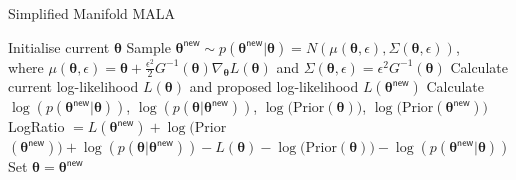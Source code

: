 \documentclass[11pt]{amsart}
\begin{document}
\begin{algorithm}[h]                      %
\caption{Simplified Manifold MALA}          %
\label{alg:SmMALARecipe}                           %
\begin{algorithmic}[1]                   %
\STATE Initialise current $\boldsymbol\theta$
\STATE Sample $\boldsymbol\theta^{\textsf{new}} \sim p(\boldsymbol\theta^{\textsf{new}}|\boldsymbol\theta) = N(\mu(\boldsymbol\theta, \epsilon), \Sigma(\boldsymbol\theta, \epsilon))$, \\where $\mu(\boldsymbol\theta, \epsilon) = \boldsymbol\theta + \frac{\epsilon^2}{2} {G}^{-1}(\boldsymbol\theta) \nabla_{\boldsymbol\theta} {L}(\boldsymbol\theta)$ and $\Sigma(\boldsymbol\theta, \epsilon) = \epsilon^2 G^{-1}(\boldsymbol\theta)$
\STATE Calculate current log-likelihood ${L}(\boldsymbol\theta)$ and proposed log-likelihood ${L}(\boldsymbol\theta^{\textsf{new}})$
\STATE Calculate $\log(p(\boldsymbol\theta^{\textsf{new}}|\boldsymbol\theta))$, $\log(p(\boldsymbol\theta|\boldsymbol\theta^{\textsf{new}}))$, $\log($Prior$(\boldsymbol\theta))$, $\log($Prior$(\boldsymbol\theta^{\textsf{new}}))$
\STATE LogRatio $= {L}(\boldsymbol\theta^{\textsf{new}}) + \log($Prior$(\boldsymbol\theta^{\textsf{new}})) + \log(p(\boldsymbol\theta|\boldsymbol\theta^{\textsf{new}})) - {L}(\boldsymbol\theta) - \log($Prior$(\boldsymbol\theta)) - \log(p(\boldsymbol\theta^{\textsf{new}}|\boldsymbol\theta))$
\STATE Set $\boldsymbol\theta = \boldsymbol\theta^{\textsf{new}}$
\ENDIF
\ENDFOR
\end{algorithmic}
\end{algorithm}
\end{document}
